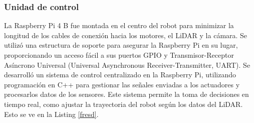     \subsubsection{Unidad de control}
    La Raspberry Pi 4 B fue montada en el centro del robot para minimizar la longitud de
        los cables de conexi\'on hacia los motores, el LiDAR y la c\'amara. Se utiliz\'o una
        estructura de soporte para asegurar la Raspberry Pi en su lugar, proporcionando un
        acceso f\'acil a sus puertos GPIO y Transmisor-Receptor As\'incrono Universal (Universal Asynchronous Receiver-Transmitter, UART).
    \vskip 0.5cm
    Se desarroll\'o un sistema de control centralizado en la Raspberry Pi, utilizando
        programaci\'on en C++ para gestionar las se\~nales enviadas a los actuadores y procesarlos datos de los sensores. Este sistema permite la toma de decisiones en tiempo real,
        como ajustar la trayectoria del robot seg\'un los datos del LiDAR. Esto se ve en la Listing \ref{fresd}.
    \vskip 0.5cm

